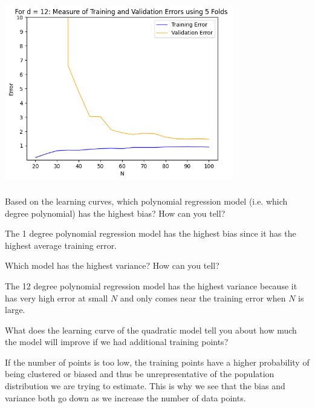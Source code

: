 \begin{solution}
  \includegraphics[width=10cm, height=8cm]{Problem_2_d=12.png}\\
\end{solution}

\begin{problem}[3]
  Based on the learning curves, which polynomial regression model (i.e. which degree polynomial) has the highest bias? How can you tell?
\end{problem}
\begin{solution}
  The 1 degree polynomial regression model has the highest bias since it has the highest
  average training error.
\end{solution}

\begin{problem}[3]
  Which model has the highest variance? How can you tell?
\end{problem}
\begin{solution}
  The 12 degree polynomial regression model has the highest variance because it has very
  high error at small $N$ and only comes near the training error when $N$ is large.
\end{solution}

\begin{problem}[3]
  What does the learning curve of the quadratic model tell you about how much the model will improve if we had additional training points?
\end{problem}
\begin{solution}
  If the number of points is too low, the training points have a higher probability of
  being clustered or biased and thus be unrepresentative of the population distribution
  we are trying to estimate. This is why we see that the bias and variance both go down
  as we increase the number of data points.
\end{solution}

